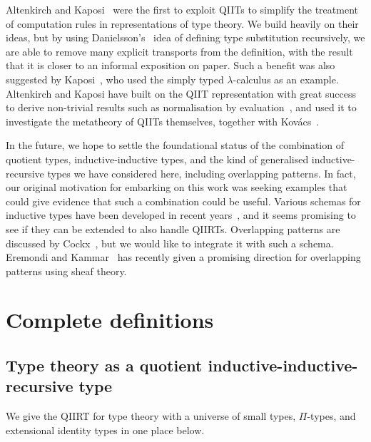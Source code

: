 \documentclass[a4paper,UKenglish,numberwithinsect,cleveref,thm-restate]{lipics-v2021}
\newcommand{\LT}[2][]{\todo[inline,author={L-T},caption={},color={pink},#1]{#2}}
\begin{document}
Altenkirch and Kaposi~\cite{Altenkirch2016a} were the first to exploit QIITs to simplify the treatment of computation rules in representations of type theory. %
We build heavily on their ideas, but by using Danielsson's~\cite{Danielsson2006} idea of defining type substitution recursively, we are able to remove many explicit transports from the definition, with the result that it is closer to an informal exposition on paper. Such a benefit was also suggested by Kaposi~\cite{Kaposi2023}, who used the simply typed $\lambda$-calculus as an example. Altenkirch and Kaposi have built on the QIIT representation with great success to derive non-trivial results such as normalisation by evaluation~\cite{Altenkirch2017}, and used it to investigate the metatheory of QIITs themselves, together with Kov\'acs~\cite{Kaposi2019}.

In the future, we hope to settle the foundational status of the
combination of quotient types, inductive-inductive types, and the kind
of generalised inductive-recursive types we have considered here,
including overlapping patterns. In fact, our original motivation for
embarking on this work was seeking examples that could give evidence
that such a combination could be useful.
%
Various schemas for inductive types have been developed in recent
years~\cite{Ghani2017,Kaposi2018,Kovacs2023}, and it seems
promising to see if they can be extended to also handle QIIRTs.
Overlapping patterns are
discussed by Cockx~\cite{Cockx2014}, but we would like to integrate it
with such a schema. Eremondi and Kammar~\cite{Eremondi2025} has
recently given a promising direction for overlapping patterns
using sheaf theory.



\appendix

\section{Complete definitions}\label{appendix:full-def}

\subsection{Type theory as a quotient inductive-inductive-recursive type}
We give the QIIRT for type theory with a universe of small types, $\Pi$-types, and extensional identity types in one place below.
\end{document}

